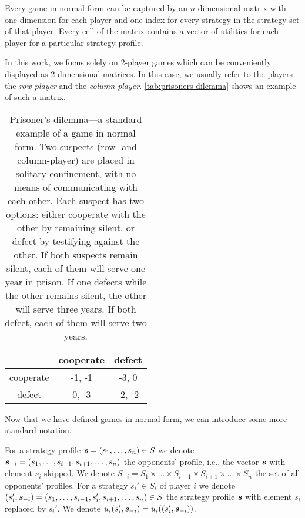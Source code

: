 Every game in normal form can be captured by an $n$-dimensional matrix with one dimension for each player and one index for every strategy in the strategy set of that player.
Every cell of the matrix contains a vector of utilities for each player for a particular strategy profile.

In this work, we focus solely on 2-player games which can be conveniently displayed as 2-dimensional matrices.
In this case, we usually refer to the players the \textit{row player} and the \textit{column player}.
\autoref{tab:prisoners-dilemma} shows an example of such a matrix.

\begin{table}
  \caption{Prisoner's dilemma---a standard example of a game in normal form.
  Two suspects (row- and column-player) are placed in solitary confinement, with no means of communicating with each other.
  Each suspect has two options: either cooperate with the other by remaining silent, or defect by testifying against the other.
  If both suspects remain silent, each of them will serve one year in prison.
  If one defects while the other remains silent, the other will serve three years.
  If both defect, each of them will serve two years.
  }
  \label{tab:prisoners-dilemma}
  \centering
  \begin{tabular}{|c|c|c|}
    \hline
              & cooperate & defect \\
    \hline
    cooperate & -1, -1    & -3, 0  \\
    \hline
    defect    & 0, -3     & -2, -2 \\
    \hline
  \end{tabular}
\end{table}

Now that we have defined games in normal form, we can introduce some more standard notation.

\begin{definition}
  For a strategy profile $\boldsymbol{\mathit{s}} = (s_1, \dots, s_n) \in S$ we denote $\boldsymbol{\mathit{s}}_{-i} = (s_1, \dots, s_{i-1}, s_{i+1}, \dots, s_n)$ the opponents' profile, i.e., the vector $\boldsymbol{\mathit{s}}$ with element $s_i$ skipped.
  We denote $S_{-i} = S_1 \times \dots \times S_{i-1} \times S_{i+1} \times \dots \times S_n$ the set of all opponents' profiles.
  For a strategy $s_i' \in S_i$ of player $i$ we denote $(s_i', \boldsymbol{\mathit{s}}_{-i}) = (s_1, \dots, s_{i-1}, s_i', s_{i+1}, \dots, s_n) \in S$ the strategy profile $\boldsymbol{\mathit{s}}$ with element $s_i$ replaced by $s_i'$.
  We denote  $u_i(s_i', \boldsymbol{\mathit{s}}_{-i}) = u_i((s_i', \boldsymbol{\mathit{s}}_{-i}))$.
\end{definition}

